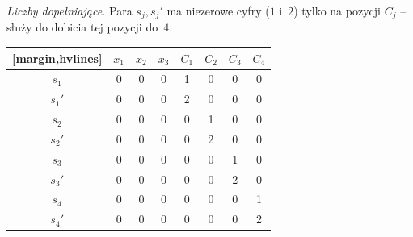 \begin{example}
	\emph{Liczby dopełniające.} Para $s_j, s_j'$ ma niezerowe cyfry ($1$ i~$2$) tylko na pozycji $C_j$ -- służy do dobicia tej pozycji do~$4$.
	\begin{table}[H]
		\centering
		\renewcommand{\arraystretch}{1.2}
		\begin{NiceTabular}{c|ccc|cccc}[margin,hvlines]
			       & $x_1$ & $x_2$ & $x_3$ & $C_1$ & $C_2$ & $C_3$ & $C_4$ \\
			\hline
			$s_1$  & 0     & 0     & 0     & 1     & 0     & 0     & 0     \\
			$s_1'$ & 0     & 0     & 0     & 2     & 0     & 0     & 0     \\
			$s_2$  & 0     & 0     & 0     & 0     & 1     & 0     & 0     \\
			$s_2'$ & 0     & 0     & 0     & 0     & 2     & 0     & 0     \\
			$s_3$  & 0     & 0     & 0     & 0     & 0     & 1     & 0     \\
			$s_3'$ & 0     & 0     & 0     & 0     & 0     & 2     & 0     \\
			$s_4$  & 0     & 0     & 0     & 0     & 0     & 0     & 1     \\
			$s_4'$ & 0     & 0     & 0     & 0     & 0     & 0     & 2     \\
		\end{NiceTabular}
	\end{table}


\end{example}

